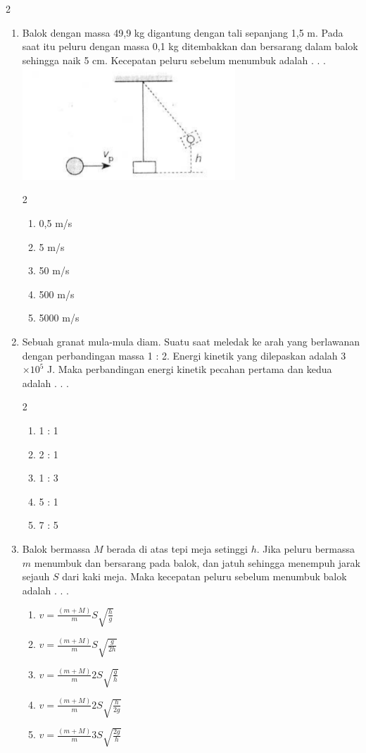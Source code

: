 \documentclass[10pt,a4paper]{extarticle}
\newcommand*\pilgan[1]{
\begin{enumerate}[label=\Alph*., itemsep=0pt,topsep=0pt,leftmargin=*,align=Center] #1 
\end{enumerate}}
\newcommand{\pilgani}[1]{                            \vspace{-0.3cm}\begin{multicols}{2}
 \begin{enumerate}[label=\Alph*., itemsep=0pt,topsep=0pt,leftmargin=*,align=Center]#1                     \end{enumerate}
 \phantom{ini cuma sapi, wedus, dan ayam}
 \end{multicols}}
\begin{document}
\begin{multicols*}{2}
\begin{enumerate}
\item Balok dengan massa 49,9 kg digantung dengan tali sepanjang 1,5 m. Pada saat itu peluru dengan massa 0,1 kg ditembakkan dan bersarang dalam balok sehingga naik 5 cm. Kecepatan peluru sebelum menumbuk adalah . . .\\
\includegraphics[width=8cm]{pic/mom3}
\pilgani{
        \item 0,5 m/s
        \item 5 m/s
        \item 50 m/s
        \item 500 m/s
        \item 5000 m/s
        }
\vspace{4cm}

\item Sebuah granat mula-mula diam. Suatu saat meledak ke arah yang berlawanan dengan perbandingan massa 1 : 2. Energi kinetik yang dilepaskan adalah 3$\times 10^5$ J. Maka perbandingan energi kinetik pecahan pertama dan kedua adalah . . .
\pilgani{
        \item 1 : 1
        \item 2 : 1
        \item 1 : 3
        \item 5 : 1
        \item 7 : 5
        }
\vspace{4cm}

\item Balok bermassa $M$ berada di atas tepi meja setinggi $h$. Jika peluru bermassa $m$ menumbuk dan bersarang pada balok, dan jatuh sehingga menempuh jarak sejauh $S$ dari kaki meja. Maka kecepatan peluru sebelum menumbuk balok adalah . . . 
\pilgan{
\item $v = \frac{(m+M)}{m} S \sqrt{\frac{h}{g}}$
\item $v = \frac{(m+M)}{m} S \sqrt{\frac{g}{2h}}$
\item $v = \frac{(m+M)}{m} 2S\sqrt{\frac{g}{h}}$
\item $v = \frac{(m+M)}{m} 2S\sqrt{\frac{h}{2g}}$
\item $v = \frac{(m+M)}{m} 3S\sqrt{\frac{2g}{h}}$
}
 

\end{enumerate}



\end{multicols*}
\end{document}
